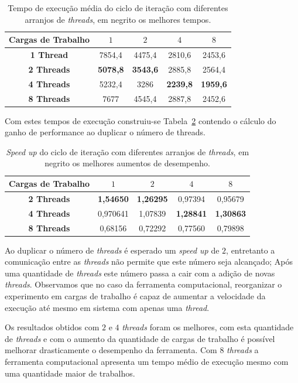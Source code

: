 \begin{table}[!htbp]
	\caption{Tempo de execução média do ciclo de iteração com diferentes arranjos de \textit{threads}, em negrito os melhores tempos.}
	\centering{}
	\begin{tabular}{c|c|c|c|c}
		\toprule 
		\textbf{Cargas de Trabalho}	& $1$ & $2$ & $4$  & $8$\\ 
		\midrule 
		\textbf{1 Thread} & 7854,4 &	4475,4 &	2810,6 &	2453,6\\ 
		\midrule 
		\textbf{2 Threads} & \textbf{5078,8} &	\textbf{3543,6} &	2885,8 &	2564,4\\ 
		\midrule 
		\textbf{4 Threads} & 5232,4 &	3286 &	\textbf{2239,8} &	\textbf{1959,6}\\ 
		\midrule 
		\textbf{8 Threads} & 7677 &	4545,4 &	2887,8 &	2452,6
		
		\\ 
		\bottomrule 
	\end{tabular} 
	\label{tab1:medium}
\end{table}

Com estes tempos de execução construiu-se Tabela~\ref{tab1:speedup} contendo o cálculo do ganho de performance ao duplicar o número de threads.

\begin{table}[!htbp]
\caption{\textit{Speed up} do ciclo de iteração com diferentes arranjos de \textit{threads}, em negrito os melhores aumentos de desempenho.}
\centering{}
\begin{tabular}{c|c|c|c|c}
	\toprule 
	\textbf{Cargas de Trabalho}	& $1$ & $2$ & $4$  & $8$\\ 
	\midrule 
	\textbf{2 Threads} & \textbf{1,54650} &	\textbf{1,26295} & 0,97394 &	0,95679\\ 
	\midrule 
	\textbf{4 Threads} & 0,970641 &	1,07839 &	\textbf{1,28841} & \textbf{1,30863}\\ 
	\midrule 
	\textbf{8 Threads} & 0,68156 &	0,72292 & 0,77560 & 0,79898
	\\ 
	\bottomrule 
\end{tabular} 
\label{tab1:speedup}
\end{table}

Ao duplicar o número de \textit{threads} é esperado um \textit{speed up} de $2$, entretanto a comunicação entre as \textit{threads} não permite que este número seja alcançado; Após uma quantidade de \textit{threads} este número passa a cair com a adição de novas \textit{threads}. Observamos que no caso da ferramenta computacional, reorganizar o experimento em cargas de trabalho é capaz de aumentar a velocidade da execução até mesmo em sistema com apenas uma \textit{thread}.

Os resultados obtidos com $2$ e $4$ \textit{threads} foram os melhores, com esta quantidade de \textit{threads} e com o aumento da quantidade de cargas de trabalho é possível melhorar drasticamente o desempenho da ferramenta. Com $8$ \textit{threads} a ferramenta computacional apresenta um tempo médio de execução mesmo com uma quantidade maior de trabalhos.